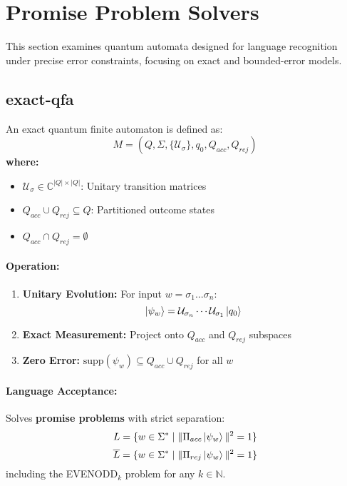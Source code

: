 \section{Promise Problem Solvers}
\label{sec:promise-qfa}

This section examines quantum automata designed for language recognition under precise error constraints, focusing on exact and bounded-error models.

\subsection{\acrfull{exact-qfa}}
\label{subsec:exact-qfa}

\begin{definition}
An exact quantum finite automaton is defined as:
\[
M = (Q, \Sigma, \{\mathcal{U}_\sigma\}, q_0, Q_{acc}, Q_{rej})
\]
\textbf{where:}
\begin{itemize}
    \item $\mathcal{U}_\sigma \in \mathbb{C}^{|Q| \times |Q|}$: Unitary transition matrices
    \item $Q_{acc} \cup Q_{rej} \subseteq Q$: Partitioned outcome states
    \item $Q_{acc} \cap Q_{rej} = \emptyset$
\end{itemize}
\end{definition}

\paragraph{Operation:}
\begin{enumerate}
    \item \textbf{Unitary Evolution:} For input $w = \sigma_1...\sigma_n$:
    \[
    \ket{\psi_w} = \mathcal{U}_{\sigma_n} \cdots \mathcal{U}_{\sigma_1} \ket{q_0}
    \]
    \item \textbf{Exact Measurement:} Project onto $Q_{acc}$ and $Q_{rej}$ subspaces
    \item \textbf{Zero Error:} $\text{supp}(\psi_w) \subseteq Q_{acc} \cup Q_{rej}$ for all $w$ \cite{nayak1999optimal}
\end{enumerate}

\paragraph{Language Acceptance:}
Solves \textbf{promise problems} with strict separation:
\[
L = \{w \in \Sigma^* \mid \|\Pi_{acc}\ket{\psi_w}\|^2 = 1\}
\]
\[
\overline{L} = \{w \in \Sigma^* \mid \|\Pi_{rej}\ket{\psi_w}\|^2 = 1\}
\]
including the EVENODD$_k$ problem for any $k \in \mathbb{N}$.

